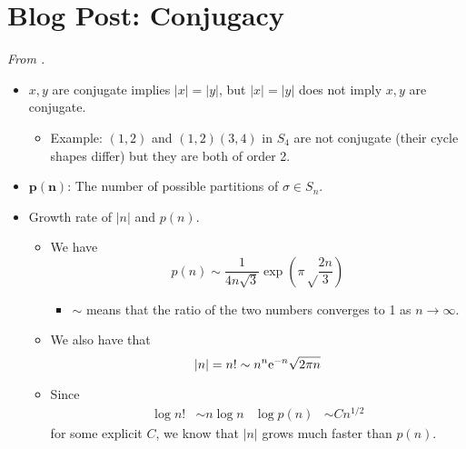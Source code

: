 \documentclass[../notes.tex]{subfiles}
\begin{document}
\section{Blog Post: Conjugacy}
\emph{From \textcite{bib:Calegari}.}
\begin{itemize}
    \item {}$x,y$ are conjugate implies $|x|=|y|$, but $|x|=|y|$ does not imply $x,y$ are conjugate.
    \begin{itemize}
        \item Example: $(1,2)$ and $(1,2)(3,4)$ in $S_4$ are not conjugate (their cycle shapes differ) but they are both of order 2.
    \end{itemize}
    \item $\bm{p(n)}$: The number of possible partitions of $\sigma\in S_n$.
    \item Growth rate of $|n|$ and $p(n)$.
    \begin{itemize}
        \item We have
        \begin{equation*}
            p(n) \sim \frac{1}{4n\sqrt{3}}\exp(\pi\sqrt\frac{2n}{3})
        \end{equation*}
        \begin{itemize}
            \item $\sim$ means that the ratio of the two numbers converges to 1 as $n\to\infty$.
        \end{itemize}
        \item We also have that
        \begin{equation*}
            |n| = n! \sim n^n\e[-n]\sqrt{2\pi n}
        \end{equation*}
        \item Since
        \begin{align*}
            \log n! &\sim n\log n&
            \log p(n) & \sim Cn^{1/2}
        \end{align*}
        for some explicit $C$, we know that $|n|$ grows much faster than $p(n)$.
    \end{itemize}
\end{itemize}
\end{document}
